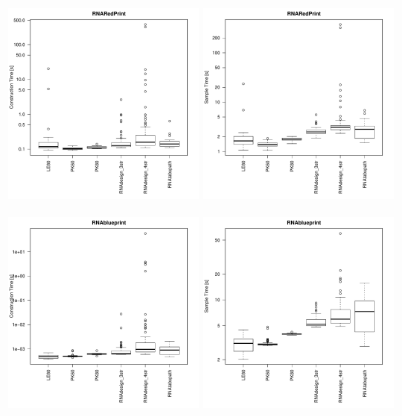 \documentclass[10pt]{article}
\newenvironment{revision}{\color{red}}{\color{black}}
\begin{document}
\begin{revision}
\begin{figure}[tbh]
  \centering
  \includegraphics[width=0.45\textwidth]{Figs/RunTimes/construction_time_sets}\quad%
  \includegraphics[width=0.45\textwidth]{Figs/RunTimes/sample_time_sets}
  \caption{}
  \label{fig:run-times-redprint}
\end{figure}
\begin{figure}[tbh]
  \centering
  \includegraphics[width=0.45\textwidth]{Figs/RunTimes/construction_time_sets_rbp}\quad%
  \includegraphics[width=0.45\textwidth]{Figs/RunTimes/sample_time_sets_rbp}
  \caption{}
  \label{fig:run-times-rbp}
\end{figure}

\end{revision}
\end{document}
